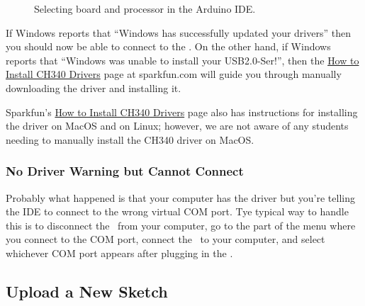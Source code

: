\begin{figure}
    \centering
    \hfil

    \caption{Selecting board and processor in the Arduino IDE.}
\end{figure}

If Windows reports that ``Windows has successfully updated your drivers'' then
you should now be able to connect to the \nano. On the other hand, if Windows
reports that ``Windows was unable to install your USB2.0-Ser!'', then the
\href{https://learn.sparkfun.com/tutorials/how-to-install-ch340-drivers/}{How
to Install CH340 Drivers} page at sparkfun.com will guide you through manually
downloading the driver and installing it.

Sparkfun's \href{https://learn.sparkfun.com/tutorials/how-to-install-ch340-drivers/}
{How to Install CH340 Drivers} page also has instructions for installing the
driver on MacOS and on Linux; however, we are not aware of any students needing
to manually install the CH340 driver on MacOS.

\subsubsection{No Driver Warning but Cannot Connect}

Probably what happened is that your computer has the driver but you're telling
the IDE to connect to the wrong virtual COM port. Tye typical way to handle this
is to disconnect the \nano\ from your computer, go to the part of the menu where
you connect to the COM port, connect the \nano\ to your computer, and select
whichever COM port appears after plugging in the \nano.

\subsection{Upload a New Sketch}


